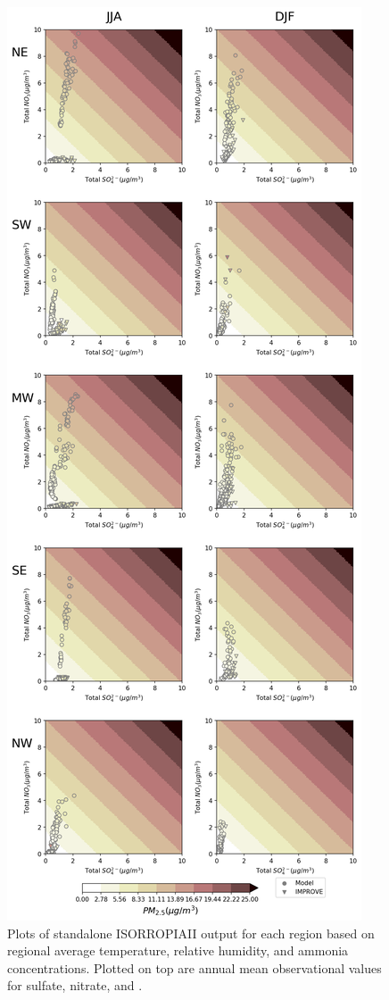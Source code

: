 \documentclass[12]{article}
\begin{document}
\begin{figure}
    \centering
    \includegraphics[scale=0.4]{ego_nonuclear_project/Figures/isorropia_obs_plot.png}
    \caption{Plots of standalone ISORROPIAII output for each region based on regional average temperature, relative humidity, and ammonia concentrations. Plotted on top are annual mean observational values for sulfate, nitrate, and .} 
    \label{fig:isorropia}
\end{figure}
\end{document}
